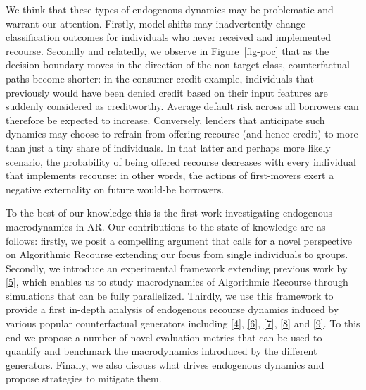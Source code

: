\documentclass[
  conference]{IEEEtran}
\begin{document}
We think that these types of endogenous dynamics may be problematic and
warrant our attention. Firstly, model shifts may inadvertently change
classification outcomes for individuals who never received and
implemented recourse. Secondly and relatedly, we observe in
Figure~\ref{fig-poc} that as the decision boundary moves in the
direction of the non-target class, counterfactual paths become shorter:
in the consumer credit example, individuals that previously would have
been denied credit based on their input features are suddenly considered
as creditworthy. Average default risk across all borrowers can therefore
be expected to increase. Conversely, lenders that anticipate such
dynamics may choose to refrain from offering recourse (and hence credit)
to more than just a tiny share of individuals. In that latter and
perhaps more likely scenario, the probability of being offered recourse
decreases with every individual that implements recourse: in other
words, the actions of first-movers exert a negative externality on
future would-be borrowers.

To the best of our knowledge this is the first work investigating
endogenous macrodynamics in AR. Our contributions to the state of
knowledge are as follows: firstly, we posit a compelling argument that
calls for a novel perspective on Algorithmic Recourse extending our
focus from single individuals to groups. Secondly, we introduce an
experimental framework extending previous work by
\protect\hyperlink{ref-altmeyer2022CounterfactualExplanations}{{[}5{]}},
which enables us to study macrodynamics of Algorithmic Recourse through
simulations that can be fully parallelized. Thirdly, we use this
framework to provide a first in-depth analysis of endogenous recourse
dynamics induced by various popular counterfactual generators including
\protect\hyperlink{ref-wachter2017counterfactual}{{[}4{]}},
\protect\hyperlink{ref-schut2021generating}{{[}6{]}},
\protect\hyperlink{ref-joshi2019towards}{{[}7{]}},
\protect\hyperlink{ref-mothilal2020explaining}{{[}8{]}} and
\protect\hyperlink{ref-antoran2020getting}{{[}9{]}}. To this end we
propose a number of novel evaluation metrics that can be used to
quantify and benchmark the macrodynamics introduced by the different
generators. Finally, we also discuss what drives endogenous dynamics and
propose strategies to mitigate them.
\end{document}
